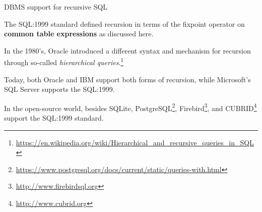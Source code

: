 \documentclass[xcolor={usenames,dvipsnames}]{beamer}
\begin{document}
%
%

\begin{frame}{DBMS support for recursive SQL} %

The SQL:1999 standard defined recursion in terms of the fixpoint operator on \textbf{common table expressions} as discussed here.

In the 1980's, Oracle introduced a different syntax and mechanism for recursion 
through so-called \emph{hierarchical queries}.\footnote{\tiny\url{https://en.wikipedia.org/wiki/Hierarchical_and_recursive_queries_in_SQL}} 

Today, both Oracle and IBM support both forms of recursion, while Microsoft's SQL Server supports the SQL:1999.

In the open-source world, besides SQLite, PostgreSQL\footnote{\tiny\url{https://www.postgresql.org/docs/current/static/queries-with.html}}, Firebird\footnote{\tiny\url{http://www.firebirdsql.org}}, and CUBRID\footnote{\tiny\url{http://www.cubrid.org}} support the SQL:1999 standard.
\end{frame} %

%
%
%
%


% 

%
%





\end{document}
